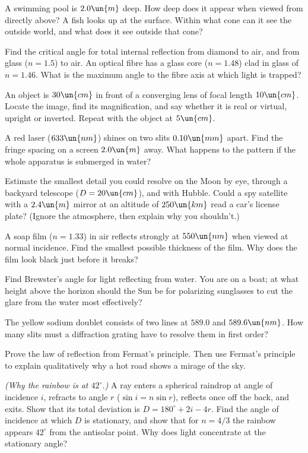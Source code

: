 \begin{problems}
 A swimming pool is $2.0\un{m}$ deep. How deep does it appear when viewed from directly above? A fish looks up at the surface. Within what cone can it see the outside world, and what does it see outside that cone?

 Find the critical angle for total internal reflection from diamond to air, and from glass ($n=1.5$) to air. An optical fibre has a glass core ($n=1.48$) clad in glass of $n=1.46$. What is the maximum angle to the fibre axis at which light is trapped?

 An object is $30\un{cm}$ in front of a converging lens of focal length $10\un{cm}$. Locate the image, find its magnification, and say whether it is real or virtual, upright or inverted. Repeat with the object at $5\un{cm}$.

\core A red laser ($633\un{nm}$) shines on two slits $0.10\un{mm}$ apart. Find the fringe spacing on a screen $2.0\un{m}$ away. What happens to the pattern if the whole apparatus is submerged in water?

\core Estimate the smallest detail you could resolve on the Moon by eye, through a backyard telescope ($D = 20\un{cm}$), and with Hubble. Could a spy satellite with a $2.4\un{m}$ mirror at an altitude of $250\un{km}$ read a car's license plate? (Ignore the atmosphere, then explain why you shouldn't.)

 A soap film ($n = 1.33$) in air reflects strongly at $550\un{nm}$ when viewed at normal incidence. Find the smallest possible thickness of the film. Why does the film look black just before it breaks?

 Find Brewster's angle for light reflecting from water. You are on a boat; at what height above the horizon should the Sun be for polarizing sunglasses to cut the glare from the water most effectively?

 The yellow sodium doublet consists of two lines at $589.0$ and $589.6\un{nm}$. How many slits must a diffraction grating have to resolve them in first order?

 Prove the law of reflection from Fermat's principle. Then use Fermat's principle to explain qualitatively why a hot road shows a mirage of the sky.

\core \label{prob:rainbow} \emph{(Why the rainbow is at $42^\circ$.)} A ray enters a spherical raindrop at angle of incidence $i$, refracts to angle $r$ ($\sin i = n\sin r$), reflects once off the back, and exits. Show that its total deviation is $D = 180^\circ + 2i - 4r$. Find the angle of incidence at which $D$ is stationary, and show that for $n = 4/3$ the rainbow appears $42^\circ$ from the antisolar point. Why does light concentrate at the stationary angle?


\end{problems}
